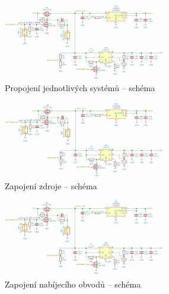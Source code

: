 \begin{figure}[htbp]
    \centering
    \includegraphics[width=\textwidth]{kapitoly/ctvrta_elektronicka_varianta/E4_zapojeni/B.B.pdf}
    \caption{Propojení jednotlivých systémů -- schéma}
    \label{fig:E4-sch_B.B}
\end{figure}
\begin{figure}[htbp]
    \centering
    \includegraphics[width=\textwidth]{kapitoly/ctvrta_elektronicka_varianta/E4_zapojeni/zdroj.pdf}
    \caption{Zapojení zdroje -- schéma}
    \label{fig:E4-sch_zdroj}
\end{figure}
\begin{figure}[htbp]
    \centering
    \includegraphics[width=\textwidth]{kapitoly/ctvrta_elektronicka_varianta/E4_zapojeni/nabijecka.pdf}
    \caption{Zapojení nabíjecího obvodů -- schéma}
    \label{fig:E4-sch_nabijecka}
\end{figure}
